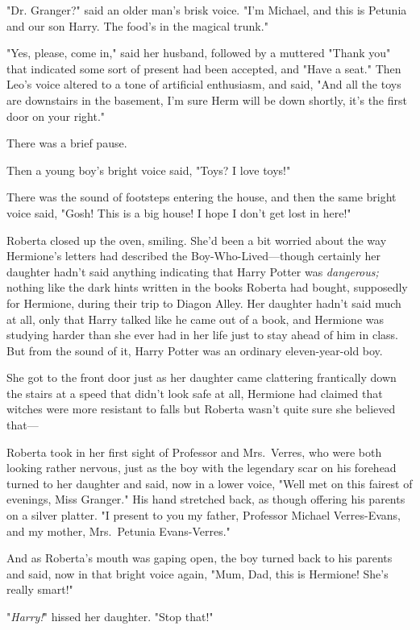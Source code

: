 "Dr. Granger?" said an older man's brisk voice. "I'm Michael, and this is 
Petunia and our son Harry. The food's in the magical trunk."

"Yes, please, come in," said her husband, followed by a muttered "Thank you" 
that indicated some sort of present had been accepted, and "Have a seat." Then 
Leo's voice altered to a tone of artificial enthusiasm, and said, "And all the 
toys are downstairs in the basement, I'm sure Herm will be down shortly, it's 
the first door on your right."

There was a brief pause.

Then a young boy's bright voice said, "Toys? I love toys!"

There was the sound of footsteps entering the house, and then the same bright 
voice said, "Gosh! This is a big house! I hope I don't get lost in here!"

Roberta closed up the oven, smiling. She'd been a bit worried about the way 
Hermione's letters had described the Boy-Who-Lived---though certainly her 
daughter hadn't said anything indicating that Harry Potter was 
\emph{dangerous;} nothing like the dark hints written in the books Roberta had 
bought, supposedly for Hermione, during their trip to Diagon Alley. Her 
daughter hadn't said much at all, only that Harry talked like he came out of a 
book, and Hermione was studying harder than she ever had in her life just to 
stay ahead of him in class. But from the sound of it, Harry Potter was an 
ordinary eleven-year-old boy.

She got to the front door just as her daughter came clattering frantically down 
the stairs at a speed that didn't look safe at all, Hermione had claimed that 
witches were more resistant to falls but Roberta wasn't quite sure she believed 
that---

Roberta took in her first sight of Professor and Mrs.~Verres, who were both 
looking rather nervous, just as the boy with the legendary scar on his forehead 
turned to her daughter and said, now in a lower voice, "Well met on this 
fairest of evenings, Miss Granger." His hand stretched back, as though offering 
his parents on a silver platter. "I present to you my father, Professor Michael 
Verres-Evans, and my mother, Mrs.~Petunia Evans-Verres."

And as Roberta's mouth was gaping open, the boy turned back to his parents and 
said, now in that bright voice again, "Mum, Dad, this is Hermione! She's really 
smart!"

"\emph{Harry!}" hissed her daughter. "Stop that!"

